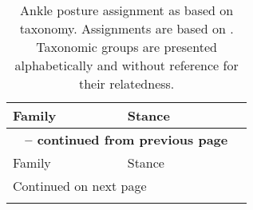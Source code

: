 
\begin{center}
  \begin{longtable}{ l l l }
    \caption[Posture assignment based on taxonomy]{Ankle posture assignment as based on taxonomy. Assignments are based on \citep{Carrano1999}. Taxonomic groups are presented alphabetically and without reference for their relatedness.} \label{tab:posture} \\

    \hline
    Family & Stance \\ \hline
    \endfirsthead

    \multicolumn{2}{p{\textwidth}}{{ \bfseries \tablename\ \thetable{} -- continued from previous page}} \\
    \hline Family & Stance \\ \hline
    \endhead

    \hline \multicolumn{2}{p{\textwidth}}{{Continued on next page}} \\ \hline
    \endfoot


\end{longtable}
\end{center}
